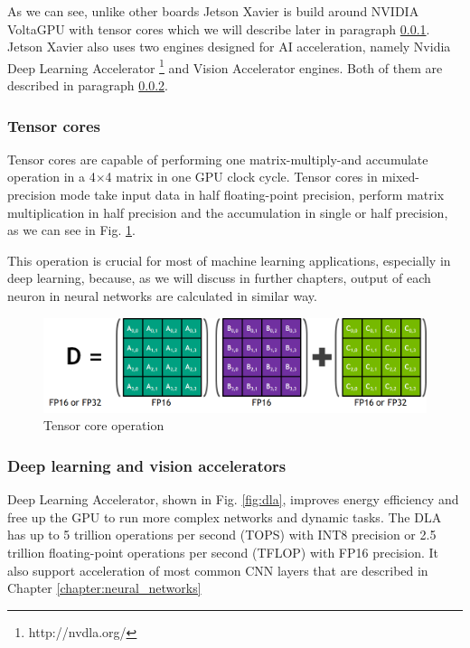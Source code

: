 \documentclass[twoside]{ctuthesis}
\theoremstyle{plain}
\theoremstyle{definition}
\theoremstyle{note}
\begin{document}
As we can see, unlike other boards Jetson Xavier is build around NVIDIA Volta\texttrademark GPU with tensor cores which we will describe later in paragraph \ref{subsection:tensor_cores}. Jetson Xavier also uses two engines designed for AI acceleration, namely Nvidia Deep Learning Accelerator \footnote{http://nvdla.org/} and Vision Accelerator engines. Both of them are described in paragraph \ref{sssection:accelerators}. 
\subsubsection{Tensor cores}
\label{subsection:tensor_cores}
Tensor cores are capable of performing one matrix-multiply-and accumulate operation in a 4$\times$4 matrix in one GPU clock cycle\cite{markidis_chien_laure_peng_vetter_2018}. Tensor cores in mixed-precision mode take input data in half floating-point precision, perform matrix multiplication in half precision and the accumulation in single or half precision, as we can see in Fig. \ref{tensor_core}.

 This operation is crucial for most of machine learning applications, especially in deep learning, because, as we will discuss in further chapters, output of each neuron in neural networks are calculated in similar way. 
\begin{figure}[h]
\caption{Tensor core operation\cite{nvidia_blog_tensor_cores}}
\label{tensor_core}
\includegraphics[width=\textwidth]{images/introduction/tensor_core.png}
\end{figure}


\subsubsection{Deep learning and vision accelerators}
\label{sssection:accelerators}

Deep Learning Accelerator, shown in Fig. \ref{fig:dla}, improves energy efficiency and free up the GPU to run more complex networks and dynamic tasks. The DLA has up to 5 trillion operations per second (TOPS) with INT8 precision or 2.5 trillion floating-point operations per second (TFLOP) with FP16 precision\cite{nvidia_developer_blog_2019}.
It also support acceleration of most common CNN layers that are described in Chapter \ref{chapter:neural_networks}
\end{document}
